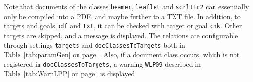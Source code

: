 




Note that documents of the classes \texttt{beamer}, \texttt{leaflet} and \texttt{scrlttr2} 
can essentially only be compiled into a PDF, 
and maybe further to a TXT file. 
In addition, to targets and goals \texttt{pdf} and \texttt{txt}, 
it can be checked with target or goal \texttt{chk}. 
Other targets are skipped, and a message is displayed. 
The relations are configurable 
through settings \texttt{targets} and \texttt{docClassesToTargets} 
both in Table~\ref{tab:paramGen} on page~\pageref{tab:paramGen}. 
Also, if a document class occurs, 
which is not registered in \texttt{docClassesToTargets}, 
a warning \texttt{WLP09} described in Table~\ref{tab:WarnLPP} 
on page~\pageref{tab:WarnLPP} is displayed. 






